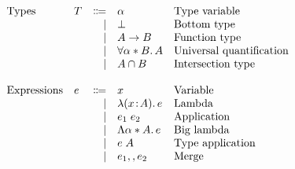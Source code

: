 \documentclass[preprint]{sigplanconf}
\begin{document}
\begin{figure}
  \[
  \begin{array}{l}
    \begin{array}{llrll}
      \text{Types}
      & T & \Coloneqq & \alpha     & \text{Type variable} \\
      &         & \mid & \bot            & \text{Bottom type} \\
      &        & \mid & A \to B         & \text{Function type}\\
      &         & \mid & \forall \alpha * B.\, A   & \text{Universal quantification} \\
      &         & \mid & A \cap B  & \text{Intersection type} \\

      \\
      \text{Expressions}
      & e & \Coloneqq & x            & \text{Variable} \\
      &   & \mid & \lambda (x \!:\! A).\, e        & \text{Lambda} \\
      &   & \mid & e_1 \; e_2  & \text{Application} \\
      &   & \mid & \Lambda \alpha * A.\, e    & \text{Big lambda} \\
      &   & \mid & e \; A         & \text{Type application} \\
      &   & \mid &  e_1 ,, e_2 & \text{Merge} \\


\end{array}
\end{array}\]
\end{figure}
\end{document}

